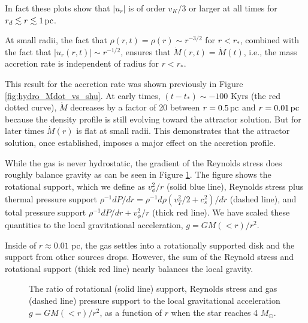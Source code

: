 \documentclass[../dissertation.tex]{subfiles}
\begin{document}
In fact these plots show that $|u_r|$ is of order $v_K/3$ or larger at all 
times for $r_d\lesssim r\lesssim 1\,\rm pc$.


At small radii, the fact that $\rho(r,t)=\rho(r)\sim r^{-3/2}$ for $r<r_*$, 
combined with the fact that $|u_r(r,t)|\sim r^{-1/2}$, ensures that 
$\dot M(r,t)=\dot M(t)$, i.e., the mass accretion rate is independent of 
radius for $r < r_*$. 

This result for the accretion rate was shown previously in Figure \ref{fig:hydro_Mdot_vs_shu}. At early times, $(t-t_*) \sim -100$ Kyrs (the red dotted curve),
$\dot{M}$ decreases by a factor of 20 between $r=0.5\,\rm pc$ and $r=0.01\,\rm pc$
because the density profile is still
evolving toward the attractor solution. But for later times $\dot M(r)$ 
is flat at small radii. This demonstrates that the attractor solution, once established, imposes a 
major effect on the accretion profile. 

While the gas is never hydrostatic, the gradient of the Reynolds
stress does roughly balance gravity as can be seen in Figure
\ref{fig:hydro_dPdr_avg}.  The figure shows the rotational support,
which we define as $v_{\phi}^2/r$ (solid blue line), Reynolds stress
plus thermal pressure support $\rho^{-1}dP/dr = \rho^{-1}d\rho
(v_T^2/2+c_s^2)/dr$ (dashed line), and total pressure support
$\rho^{-1}dP/dr + v_\phi^2/r$ (thick red line).  We have scaled these
quantities to the local gravitational acceleration, $g=GM(<r)/r^2$.



Inside of $r\approx 0.01$ pc, the gas settles into a rotationally supported 
disk and the support from other sources drops. However,  
the sum of the Reynold stress and rotational support (thick red line) nearly balances 
the local gravity. 

\begin{figure}[htb]%
\caption[Hydro Ratio of Pressure and Gravity]{The ratio of rotational (solid line) support, Reynolds stress and gas 
(dashed line) pressure support to the local gravitational acceleration 
$g = GM(<r)/r^2$, as a function of $r$ when the star reaches 4 
$M_{\odot}$. \label{fig:hydro_dPdr_avg}}
\end{figure}
\end{document}
